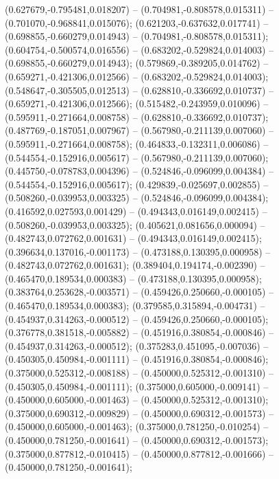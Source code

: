  (0.627679,-0.795481,0.018207) -- (0.704981,-0.808578,0.015311) -- (0.701070,-0.968841,0.015076);
 (0.621203,-0.637632,0.017741) -- (0.698855,-0.660279,0.014943) -- (0.704981,-0.808578,0.015311);
 (0.604754,-0.500574,0.016556) -- (0.683202,-0.529824,0.014003) -- (0.698855,-0.660279,0.014943);
 (0.579869,-0.389205,0.014762) -- (0.659271,-0.421306,0.012566) -- (0.683202,-0.529824,0.014003);
 (0.548647,-0.305505,0.012513) -- (0.628810,-0.336692,0.010737) -- (0.659271,-0.421306,0.012566);
 (0.515482,-0.243959,0.010096) -- (0.595911,-0.271664,0.008758) -- (0.628810,-0.336692,0.010737);
 (0.487769,-0.187051,0.007967) -- (0.567980,-0.211139,0.007060) -- (0.595911,-0.271664,0.008758);
 (0.464833,-0.132311,0.006086) -- (0.544554,-0.152916,0.005617) -- (0.567980,-0.211139,0.007060);
 (0.445750,-0.078783,0.004396) -- (0.524846,-0.096099,0.004384) -- (0.544554,-0.152916,0.005617);
 (0.429839,-0.025697,0.002855) -- (0.508260,-0.039953,0.003325) -- (0.524846,-0.096099,0.004384);
 (0.416592,0.027593,0.001429) -- (0.494343,0.016149,0.002415) -- (0.508260,-0.039953,0.003325);
 (0.405621,0.081656,0.000094) -- (0.482743,0.072762,0.001631) -- (0.494343,0.016149,0.002415);
 (0.396634,0.137016,-0.001173) -- (0.473188,0.130395,0.000958) -- (0.482743,0.072762,0.001631);
 (0.389404,0.194174,-0.002390) -- (0.465470,0.189534,0.000383) -- (0.473188,0.130395,0.000958);
 (0.383764,0.253628,-0.003571) -- (0.459426,0.250660,-0.000105) -- (0.465470,0.189534,0.000383);
 (0.379585,0.315894,-0.004731) -- (0.454937,0.314263,-0.000512) -- (0.459426,0.250660,-0.000105);
 (0.376778,0.381518,-0.005882) -- (0.451916,0.380854,-0.000846) -- (0.454937,0.314263,-0.000512);
 (0.375283,0.451095,-0.007036) -- (0.450305,0.450984,-0.001111) -- (0.451916,0.380854,-0.000846);
 (0.375000,0.525312,-0.008188) -- (0.450000,0.525312,-0.001310) -- (0.450305,0.450984,-0.001111);
 (0.375000,0.605000,-0.009141) -- (0.450000,0.605000,-0.001463) -- (0.450000,0.525312,-0.001310);
 (0.375000,0.690312,-0.009829) -- (0.450000,0.690312,-0.001573) -- (0.450000,0.605000,-0.001463);
 (0.375000,0.781250,-0.010254) -- (0.450000,0.781250,-0.001641) -- (0.450000,0.690312,-0.001573);
 (0.375000,0.877812,-0.010415) -- (0.450000,0.877812,-0.001666) -- (0.450000,0.781250,-0.001641);
